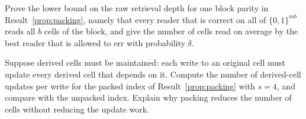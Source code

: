 \begin{exercise}
Prove the lower bound on the raw retrieval depth for one block parity in Result~\ref{prop:packing}, namely that every reader that is correct on all of $\{0,1\}^{mb}$ reads all $b$ cells of the block, and give the number of cells read on average by the best reader that is allowed to err with probability $\delta$.
\end{exercise}

\begin{exercise}
Suppose derived cells must be maintained: each write to an original cell must update every derived cell that depends on it. Compute the number of derived-cell updates per write for the packed index of Result~\ref{prop:packing} with $s=4$, and compare with the unpacked index. Explain why packing reduces the number of cells without reducing the update work.\label{ex:update-work}
\end{exercise}

